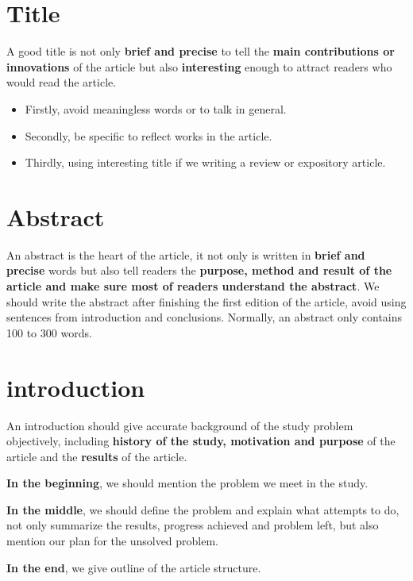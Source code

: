 \section{Title}
A good title is not only \textbf{brief and precise} to tell the \textbf{main contributions or innovations} of the article but also \textbf{interesting} enough to attract readers who would read the article.
\begin{itemize}
	\item Firstly, avoid meaningless words or  to talk in general.
	\item Secondly, be specific to reflect works in the article.
	\item Thirdly, using  interesting title if we writing a review or expository article.
\end{itemize}



\section{Abstract}
An abstract is the heart of the article, it not only is written in \textbf{brief and precise} words but also tell readers the \textbf{purpose, method and result of the article and make sure most of  readers understand the abstract}. We should write the abstract after finishing the first edition of the article, avoid using sentences from  introduction and conclusions. Normally, an abstract only contains 100 to 300 words.



\section{introduction}
An introduction should give  accurate background of the study problem objectively, including \textbf{history of the study, motivation and purpose} of the article and the \textbf{results} of the article.

\textbf{In the beginning}, we should mention the problem we meet in the study.

\textbf{In the middle}, we should define the problem and explain what attempts to do, not only summarize the results, progress achieved and problem left, but also mention our plan for the unsolved problem.

\textbf{In the end}, we give  outline of the article structure.



